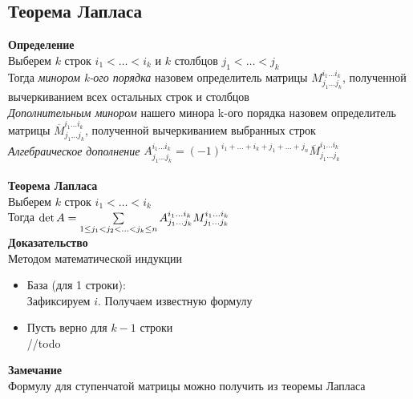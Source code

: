 \documentclass[12pt]{article}
\begin{document}
\subsection{Теорема Лапласа}
\textbf{Определение}\\
Выберем $k$ строк $i_1 < \ldots < i_k$ и $k$ столбцов $j_1 < \ldots < j_k$\\
Тогда \textit{минором k-ого порядка} назовем определитель матрицы $M_{j_1\ldots j_k}^{i_1\ldots i_k}$, полученной вычеркиванием всех остальных строк и столбцов\\
\textit{Дополнительным минором} нашего минора k-ого порядка назовем определитель матрицы $\overline{M}_{j_1\ldots j_k}^{i_1\ldots i_k}$, полученной вычеркиванием выбранных строк\\
\textit{Алгебраическое дополнение} $A_{j_1\ldots j_k}^{i_1\ldots i_k} = (-1)^{i_1+\ldots+i_k+j_1+\ldots+j_n}\overline{M}_{j_1\ldots j_k}^{i_1\ldots i_k}$\\\\
\textbf{Теорема Лапласа}\\
Выберем $k$ строк $i_1 < \ldots < i_k$\\
Тогда $\det A = \sum\limits_{1 \leq j_1 < j_2 < \ldots < j_k \leq n} A_{j_1\ldots j_k}^{i_1\ldots i_k}M_{j_1\ldots j_k}^{i_1\ldots i_k}$\\
\textbf{Доказательство}\\
Методом математической индукции
\begin{itemize}
    \item База (для 1 строки):\\
    Зафиксируем $i$. Получаем известную формулу
    \item Пусть верно для $k-1$ строки\\
    //todo
\end{itemize}
\textbf{Замечание}\\
Формулу для ступенчатой матрицы можно получить из теоремы Лапласа\\
\end{document}
